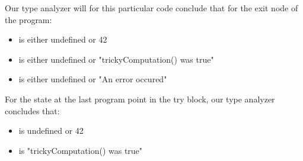 Our type analyzer will for this particular code conclude that for the exit node of the program:

\begin{itemize}
	\item {} is either undefined or 42
	\item {} is either undefined or "trickyComputation() was true"
	\item {} is either undefined or "An error occured"
\end{itemize}

For the state at the last program point in the try block, our type analyzer concludes that:

\begin{itemize}
	\item {} is undefined or 42
	\item {} is "trickyComputation() was true"
\end{itemize}